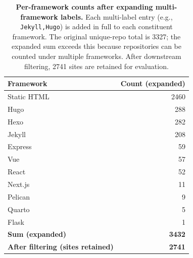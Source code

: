 \begin{table}[t]
\centering
\small
\setlength{\tabcolsep}{8pt}
\renewcommand{\arraystretch}{1.15}
\begin{tabular}{l r}
\toprule
\textbf{Framework} & \textbf{Count (expanded)} \\
\midrule
Static HTML & 2460 \\
Hugo        & 288 \\
Hexo        & 282 \\
Jekyll      & 208 \\
Express     & 59 \\
Vue         & 57 \\
React       & 52 \\
Next.js     & 11 \\
Pelican     & 9 \\
Quarto      & 5 \\
Flask       & 1 \\
\midrule
\textbf{Sum (expanded)} & \textbf{3432} \\
\textbf{After filtering (sites retained)} & \textbf{2741} \\
\bottomrule
\end{tabular}
\caption{\textbf{Per-framework counts after expanding multi-framework labels.}
Each multi-label entry (e.g., \texttt{Jekyll,Hugo}) is added in full to each constituent framework. The original unique-repo total is 3327; the expanded sum exceeds this because repositories can be counted under multiple frameworks. After downstream filtering, 2741 sites are retained for evaluation.}
\label{tab:framework_counts_expanded}
\end{table}





